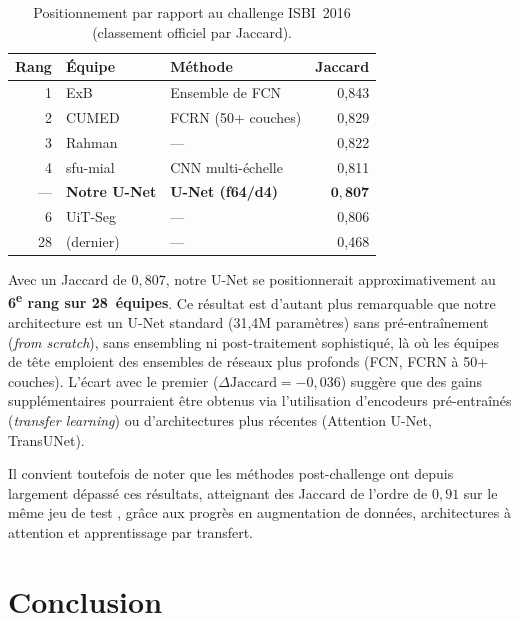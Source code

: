 \documentclass[12pt,a4paper]{article}
\begin{document}
\begin{table}[H]
\centering
\caption{Positionnement par rapport au challenge ISBI~2016 (classement officiel par Jaccard).}
\label{tab:isbi_leaderboard}
\begin{tabular}{r l l r}
\toprule
\textbf{Rang} & \textbf{Équipe} & \textbf{Méthode} & \textbf{Jaccard} \\
\midrule
1 & ExB            & Ensemble de FCN           & 0{,}843 \\
2 & CUMED          & FCRN (50+ couches)        & 0{,}829 \\
3 & Rahman         & ---                       & 0{,}822 \\
4 & sfu-mial       & CNN multi-échelle         & 0{,}811 \\
\midrule
--- & \textbf{Notre U-Net} & \textbf{U-Net (f64/d4)} & $\mathbf{0{,}807}$ \\
\midrule
6 & UiT-Seg        & ---                       & 0{,}806 \\
28 & (dernier)     & ---                       & 0{,}468 \\
\bottomrule
\end{tabular}
\end{table}

Avec un Jaccard de $0{,}807$, notre U-Net se positionnerait approximativement au \textbf{6\textsuperscript{e} rang sur 28~équipes}. Ce résultat est d'autant plus remarquable que notre architecture est un U-Net standard (31,4M paramètres) sans pré-entraînement (\emph{from scratch}), sans ensembling ni post-traitement sophistiqué, là où les équipes de tête emploient des ensembles de réseaux plus profonds (FCN, FCRN à 50+ couches). L'écart avec le premier ($\Delta\text{Jaccard} = -0{,}036$) suggère que des gains supplémentaires pourraient être obtenus via l'utilisation d'encodeurs pré-entraînés (\emph{transfer learning}) ou d'architectures plus récentes (Attention U-Net, TransUNet).

Il convient toutefois de noter que les méthodes post-challenge ont depuis largement dépassé ces résultats, atteignant des Jaccard de l'ordre de $0{,}91$ sur le même jeu de test \citep{codella2018skin}, grâce aux progrès en augmentation de données, architectures à attention et apprentissage par transfert.


\section{Conclusion}
\label{sec:conclusion}
\end{document}
